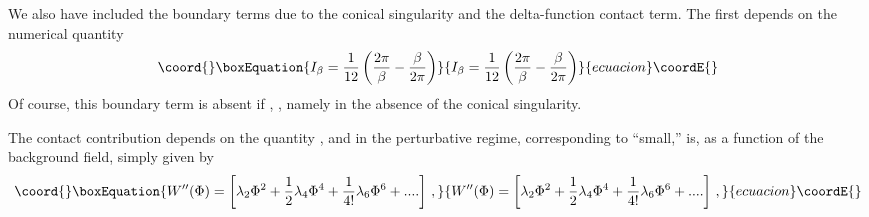 \documentclass[a4paper,aps,prl,preprint,groupedaddress,showpacs,nobibnotes,tightenlines]{revtex4}
\begin{document}
We also have included the boundary terms due to the conical singularity and 
the delta-function contact term. The first  depends on the numerical 
quantity \cite{cone} 
\begin{equation}\coord{}\boxEquation{
I_\beta=\frac{1}{12}\left( \frac{2\pi}{\beta}-\frac{\beta}{2\pi}\right)
}{
I_\beta=\frac{1}{12}\left( \frac{2\pi}{\beta}-\frac{\beta}{2\pi}\right)
}{ecuacion}\coordE{}\end{equation}
Of course, this boundary term is  absent if \myHighlight{$\beta=2\pi$}\coordHE{}, \coordHE{}, 
 namely in the absence of the conical singularity.

 The contact contribution depends on the quantity \coordHE{}, and in the 
perturbative regime, corresponding to \coordHE{} ``small,'' is, 
as a function of the background field, simply given by
\begin{equation}\coord{}\boxEquation{
W''(\Phi)=\left[\lambda_2 \Phi^2+\frac{1}{2}\lambda_4 \Phi^4+
\frac{1}{4!}\lambda_6\Phi^6+....
 \right]\,,  
\label{con}
}{
W''(\Phi)=\left[\lambda_2 \Phi^2+\frac{1}{2}\lambda_4 \Phi^4+
\frac{1}{4!}\lambda_6\Phi^6+....
 \right]\,,  
}{ecuacion}\coordE{}\end{equation}
\end{document}
